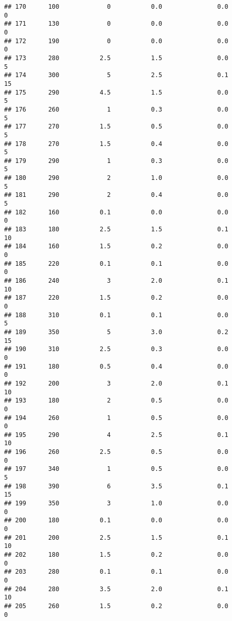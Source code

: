 \documentclass[
]{article}
\begin{document}
\begin{verbatim}
## 170      100             0           0.0               0.0           0
## 171      130             0           0.0               0.0           0
## 172      190             0           0.0               0.0           0
## 173      280           2.5           1.5               0.0           5
## 174      300             5           2.5               0.1          15
## 175      290           4.5           1.5               0.0           5
## 176      260             1           0.3               0.0           5
## 177      270           1.5           0.5               0.0           5
## 178      270           1.5           0.4               0.0           5
## 179      290             1           0.3               0.0           5
## 180      290             2           1.0               0.0           5
## 181      290             2           0.4               0.0           5
## 182      160           0.1           0.0               0.0           0
## 183      180           2.5           1.5               0.1          10
## 184      160           1.5           0.2               0.0           0
## 185      220           0.1           0.1               0.0           0
## 186      240             3           2.0               0.1          10
## 187      220           1.5           0.2               0.0           0
## 188      310           0.1           0.1               0.0           5
## 189      350             5           3.0               0.2          15
## 190      310           2.5           0.3               0.0           0
## 191      180           0.5           0.4               0.0           0
## 192      200             3           2.0               0.1          10
## 193      180             2           0.5               0.0           0
## 194      260             1           0.5               0.0           0
## 195      290             4           2.5               0.1          10
## 196      260           2.5           0.5               0.0           0
## 197      340             1           0.5               0.0           5
## 198      390             6           3.5               0.1          15
## 199      350             3           1.0               0.0           0
## 200      180           0.1           0.0               0.0           0
## 201      200           2.5           1.5               0.1          10
## 202      180           1.5           0.2               0.0           0
## 203      280           0.1           0.1               0.0           0
## 204      280           3.5           2.0               0.1          10
## 205      260           1.5           0.2               0.0           0

\end{verbatim}
\end{document}
